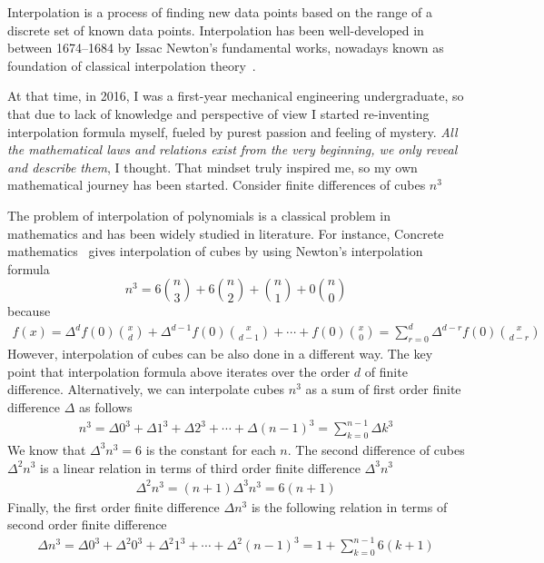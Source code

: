 Interpolation is a process of finding new data points based on the range of a discrete set of known data points.
Interpolation has been well-developed in between 1674--1684
by Issac Newton's fundamental works, nowadays known as foundation of classical interpolation
theory~\cite{meijering2002chronology}.

At that time, in 2016, I was a first-year mechanical engineering undergraduate,
so that due to lack of knowledge and perspective of view I started re-inventing interpolation
formula myself, fueled by purest passion and feeling of mystery.
\textit{All the mathematical laws and relations exist from the very beginning, we only reveal and describe them},
I thought.
That mindset truly inspired me, so my own mathematical journey has been started.
Consider finite differences of cubes $n^3$

The problem of interpolation of polynomials is a classical problem in mathematics and has been widely studied in literature.
For instance, Concrete mathematics~\cite[p. 190]{graham1994concrete} gives interpolation of cubes by using
Newton's interpolation formula
\[
    n^3 = 6 \binom{n}{3} + 6 \binom{n}{2} + \binom{n}{1} + 0 \binom{n}{0}
\]
because
\begin{align*}
    f(x) = \Delta^{d} f(0) \binom{x}{d} +  \Delta^{d-1} f(0) \binom{x}{d-1} + \cdots + f(0) \binom{x}{0}
    = \sum_{r=0}^{d} \Delta^{d-r} f(0) \binom{x}{d-r}
\end{align*}
However, interpolation of cubes can be also done in a different way.
The key point that interpolation formula above iterates over the order $d$ of finite difference.
Alternatively, we can interpolate cubes $n^3$ as a sum of first order finite difference $\Delta$ as follows
\begin{align*}
    n^3 = \Delta 0^3 + \Delta 1^3 + \Delta 2^3 + \cdots + \Delta (n-1)^3 = \sum_{k=0}^{n-1} \Delta k^3
\end{align*}
We know that $\Delta^3 n^3 = 6$ is the constant for each $n$.
The second difference of cubes $\Delta^2 n^3$ is a linear relation in terms of third order finite difference
$\Delta^3 n^3$
\begin{align*}
    \label{eq:second-difference-linear-relation}
    \Delta^2 n^3 = (n+1) \Delta^3 n^3 = 6(n+1)
\end{align*}
Finally, the first order finite difference $\Delta n^3$ is the following relation in terms of second
order finite difference
\begin{align*}
    \Delta n^3 = \Delta 0^3 + \Delta^2 0^3 + \Delta^2 1^3 + \cdots + \Delta^2 (n-1)^3 = 1 + \sum_{k=0}^{n-1} 6(k+1)
\end{align*}
